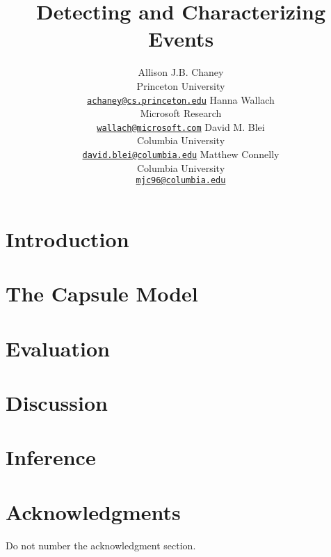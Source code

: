 \documentclass[11pt,letterpaper]{article}
\title{Detecting and Characterizing Events}
\author{
Allison J.B. Chaney\\
    Princeton University\\
	\href{mailto:achaney@cs.princeton.edu}{\nolinkurl{achaney@cs.princeton.edu}}
\And
Hanna Wallach\\
    Microsoft Research\\
    \href{mailto:wallach@microsoft.com}{\nolinkurl{wallach@microsoft.com}}
\AND
David M. Blei\\
    Columbia University\\
    \href{mailto:david.blei@columbia.edu}{\nolinkurl{david.blei@columbia.edu}}
\And
Matthew Connelly\\
    Columbia University\\
    \href{mailto:mjc96@columbia.edu}{\nolinkurl{mjc96@columbia.edu}}
}
\date{}
\begin{document}
\maketitle

\begin{abstract}

\end{abstract}
 

\section{Introduction}
\label{sec:intro}


\section{The Capsule Model}
\label{sec:model}


\section{Evaluation}
\label{sec:eval}


\section{Discussion}
\label{sec:discussion}


\appendix
\section{Inference}
\label{sec:inference}




\section*{Acknowledgments}

Do not number the acknowledgment section. %



\end{document}
